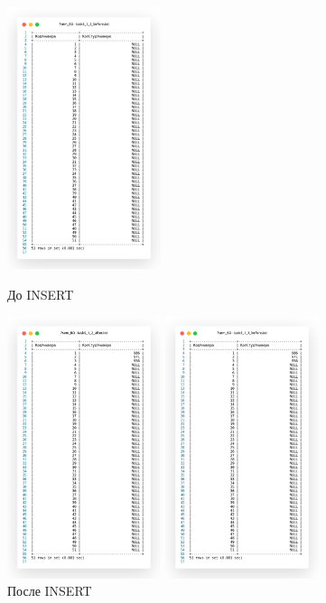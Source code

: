 \begin{figure}[!h]
  \centering

  \begin{minipage}{0.24\textwidth}
    \centering

    \includegraphics[width=4.5cm]
    {../sql/task5/task5_1_2_before.png}

    \caption{До INSERT}
    \label{fig:task5_1_2_before}
  \end{minipage}
  \begin{minipage}{0.24\textwidth}
    \centering

    \includegraphics[width=4.5cm]
    {../sql/task5/task5_1_2_after.png}

    \caption{После INSERT}
    \label{fig:task5_1_2_after}
  \end{minipage}
  \begin{minipage}{0.24\textwidth}
    \centering

    \includegraphics[width=4.5cm]
    {../sql/task5/task5_1_3_before.png}


\end{minipage}
\end{figure}
